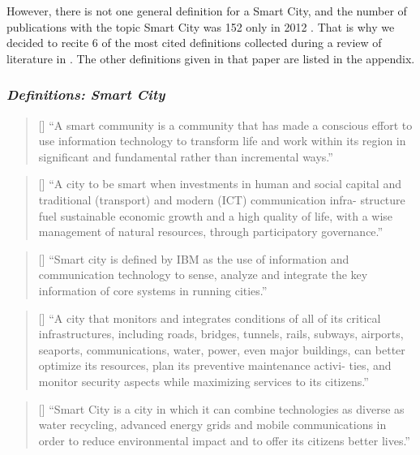 However, there is not one general definition for a Smart City, and the number of publications with the topic Smart City was 152 only in 2012 \parencite{smartCity}. That is why we decided to recite 6 of the most cited definitions collected during a review of literature in \textcite{smartCity}. The other definitions given in that paper are listed in the appendix. 

\subsubsection{\textit{Definitions: Smart City}}

\begin{quote}[\textcite{smart2}]
“A smart community is a community that has made a conscious effort to use information technology to transform life and work within its region in significant and fundamental rather than incremental ways.” \end{quote}

\begin{quote}[\textcite{smart3}]
“A city to be smart when investments in human and social capital
and traditional (transport) and modern (ICT) communication infra- structure fuel sustainable economic growth and a high quality of life, with a wise management of natural resources, through participatory governance.” 
\end{quote}

\begin{quote}[\textcite{smart4}]
“Smart city is defined by IBM as the use of information and communication technology to sense, analyze and integrate the key information of core systems in running cities.” 
\end{quote}

\begin{quote}[\textcite{smart7}]
“A city that monitors and integrates conditions of all of its critical infrastructures, including roads, bridges, tunnels, rails, subways, airports, seaports, communications, water, power, even major buildings, can better optimize its resources, plan its preventive maintenance activi- ties, and monitor security aspects while maximizing services to its citizens.”
\end{quote}

\begin{quote}[\textcite{smart8}]
“Smart City is a city in which it can combine technologies as diverse
as water recycling, advanced energy grids and mobile communications in order to reduce environmental impact and to offer its citizens better lives.”
\end{quote}

